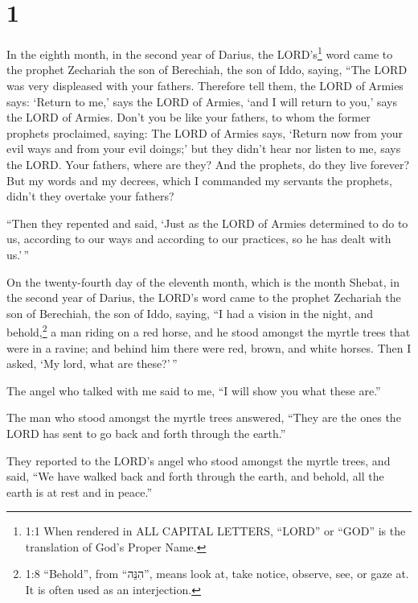 \hypertarget{section}{%
\section{1}\label{section}}

 In the eighth month, in the second year of Darius, the
LORD's\footnote{1:1 When rendered in ALL CAPITAL LETTERS, ``LORD'' or
  ``GOD'' is the translation of God's Proper Name.} word came to the
prophet Zechariah the son of Berechiah, the son of Iddo, saying,
 ``The LORD was very displeased with your fathers.
 Therefore tell them, the LORD of Armies says: `Return to
me,' says the LORD of Armies, `and I will return to you,' says the LORD
of Armies.  Don't you be like your fathers, to whom the
former prophets proclaimed, saying: The LORD of Armies says, `Return now
from your evil ways and from your evil doings;' but they didn't hear nor
listen to me, says the LORD.  Your fathers, where are they?
And the prophets, do they live forever?  But my words and my
decrees, which I commanded my servants the prophets, didn't they
overtake your fathers?

``Then they repented and said, `Just as the LORD of Armies determined to
do to us, according to our ways and according to our practices, so he
has dealt with us.'\,''

 On the twenty-fourth day of the eleventh month, which is
the month Shebat, in the second year of Darius, the LORD's word came to
the prophet Zechariah the son of Berechiah, the son of Iddo, saying,
 ``I had a vision in the night, and behold,\footnote{1:8
  ``Behold'', from ``הִנֵּה'', means look at, take notice, observe, see,
  or gaze at. It is often used as an interjection.} a man riding on a
red horse, and he stood amongst the myrtle trees that were in a ravine;
and behind him there were red, brown, and white horses. 
Then I asked, `My lord, what are these?'\,''

The angel who talked with me said to me, ``I will show you what these
are.''

 The man who stood amongst the myrtle trees answered,
``They are the ones the LORD has sent to go back and forth through the
earth.''

 They reported to the LORD's angel who stood amongst the
myrtle trees, and said, ``We have walked back and forth through the
earth, and behold, all the earth is at rest and in peace.''

